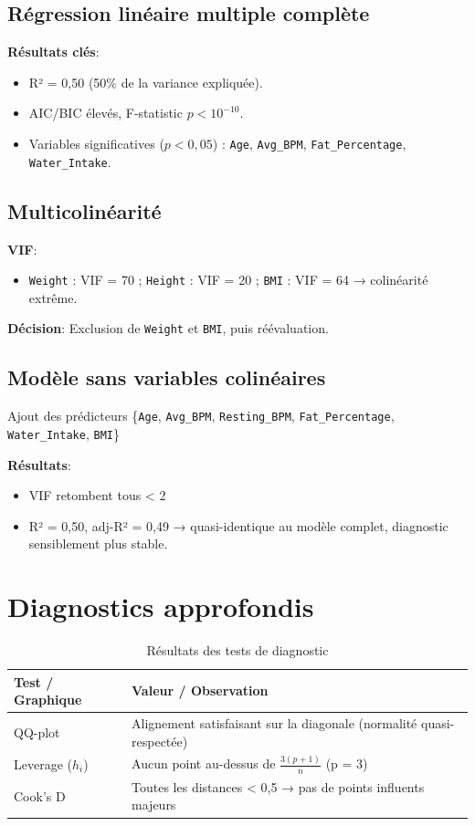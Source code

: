 \documentclass[12pt,a4paper]{article}
\begin{document}
\subsection{Régression linéaire multiple complète}
\textbf{Résultats clés}:
\begin{itemize}
    \item R² = 0,50 (50\% de la variance expliquée).
    \item AIC/BIC élevés, F-statistic \begin{math}p < {10}^{-10}.\end{math}
    \item Variables significatives (\(p < 0,05\)) : \texttt{Age}, \texttt{Avg\_BPM}, \texttt{Fat\_Percentage}, \texttt{Water\_Intake}.
\end{itemize}

\subsection{Multicolinéarité}
\textbf{VIF}:
\begin{itemize}
    \item \texttt{Weight} : VIF = 70 ; \texttt{Height} : VIF = 20 ; \texttt{BMI} : VIF = 64 → colinéarité extrême.
\end{itemize}

\textbf{Décision}:
Exclusion de \texttt{Weight} et \texttt{BMI}, puis réévaluation.

\subsection{Modèle sans variables colinéaires}
Ajout des prédicteurs \{\texttt{Age}, \texttt{Avg\_BPM}, \texttt{Resting\_BPM}, \texttt{Fat\_Percentage}, \texttt{Water\_Intake}, \texttt{BMI}\}

\textbf{Résultats}:
\begin{itemize}
    \item VIF retombent tous < 2
    \item R² = 0,50, adj-R² = 0,49 → quasi-identique au modèle complet, diagnostic sensiblement plus stable.
\end{itemize}

\section{Diagnostics approfondis}

\begin{table}[H]
  \centering
  \caption{Résultats des tests de diagnostic}
  \begin{tabular}{ll}
  \toprule
  \textbf{Test / Graphique} & \textbf{Valeur / Observation} \\
  \midrule
  QQ-plot              & Alignement satisfaisant sur la diagonale (normalité quasi-respectée) \\
  Leverage (\(h_i\))   & Aucun point au-dessus de \(\tfrac{3(p+1)}{n}\) (p = 3) \\
  Cook’s D             & Toutes les distances < 0,5 → pas de points influents majeurs \\
  \bottomrule
  \end{tabular}
\end{table}
\end{document}
